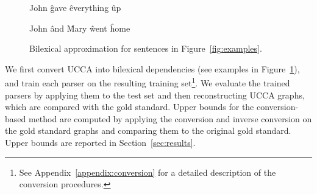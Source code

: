 \documentclass[11pt,a4paper]{article}
\newcommand{\secref}[1]{Section~\ref{#1}}
\newcommand{\figref}[1]{Figure~\ref{#1}}
\begin{document}
\begin{figure}[ht]
\centering
{}
\begin{dependency}[theme = simple]
\begin{deptext}[column sep=.7em,ampersand replacement=\^]
John \^ gave \^ everything \^ up \\
\end{deptext}
\end{dependency}
\begin{dependency}[theme = simple]
\begin{deptext}[column sep=.7em,ampersand replacement=\^]
John \^ and \^ Mary \^ went \^ home \\
\end{deptext}
\end{dependency}
\caption{Bilexical approximation for sentences in \figref{fig:examples}.}
\label{fig:bilexical_example}
\end{figure}

We first convert UCCA into bilexical dependencies
(see examples in \figref{fig:bilexical_example}), and train each parser on the resulting
training set\footnote{See Appendix~\ref{appendix:conversion} for a detailed description of
the conversion procedures.}.
We evaluate the trained parsers by applying them to the test set
and then reconstructing UCCA graphs, which are compared with the gold standard.
Upper bounds for the conversion-based method are computed by applying
the conversion and inverse conversion on the gold standard
graphs and comparing them to the original gold standard.
Upper bounds are reported in \secref{sec:results}.

\end{document}

